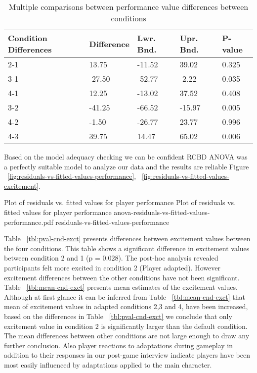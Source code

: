 \documentclass[conference]{IEEEtran}
\begin{document}
\begin{table}[h]
\caption{Multiple comparisons between performance value differences between conditions}
\label{tbl:pval-cnd-perf}
\centering
\begin{tabular}{lllll}
\hline
Condition \newline
Differences &   Difference  &   Lwr. Bnd.      &     Upr. Bnd.   &  P-value     \\
\hline
2-1         &    13.75      &     -11.52       &      39.02      &  0.325       \\
3-1         &   -27.50      &     -52.77       &      -2.22      &  0.035       \\
4-1         &    12.25      &     -13.02       &      37.52      &  0.408       \\
3-2         &   -41.25      &     -66.52       &     -15.97      &  0.005       \\
4-2         &    -1.50      &     -26.77       &      23.77      &  0.996       \\
4-3         &    39.75      &     14.47        &      65.02      &  0.006       \\
\hline
\end{tabular}
\end{table}

Based on the model adequacy checking we can be confident RCBD ANOVA was a perfectly suitable model to analyze our data and the results are reliable Figure ~\ref{fig:residuals-vs-fitted-values-performance}, ~\ref{fig:residuals-vs-fitted-values-excitement}.

\img
{Plot of residuals vs. fitted values for player performance}
{Plot of residuals vs. fitted values for player performance}
{anova-residuals-vs-fitted-values-performance.pdf}
{residuals-vs-fitted-values-performance}

Table ~\ref{tbl:pval-cnd-exct} presents differences between excitement values between the four conditions. This table shows a significant difference in excitement values between condition 2 and 1 (p = 0.028). The post-hoc analysis revealed participants felt more excited in condition 2 (Player adapted). However excitement differences between the other conditions have not been significant. Table ~\ref{tbl:mean-cnd-exct} presents mean estimates of the excitement values. Although at first glance it can be inferred from Table ~\ref{tbl:mean-cnd-exct} that mean of excitement values in adapted conditions 2,3 and 4, have been increased, based on the differences in Table ~\ref{tbl:pval-cnd-exct} we conclude that only excitement value in condition 2 is significantly larger than the default condition. The mean differences between other conditions are not large enough to draw any further conclusion. Also player reactions to adaptations during gameplay in addition to their responses in our post-game interview indicate players have been most easily influenced by adaptations applied to the main character.
\end{document}
